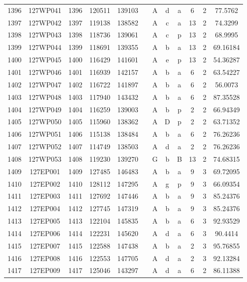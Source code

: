 \begin{tabular}{|*{12}{c|}}
1396 & 127WP041 & 1396 & 120511 & 139103 &  & A & d & a & 6 & 2 & 77.5762 \\ 
1397 & 127WP042 & 1397 & 119138 & 138582 &  & A & c & a & 13 & 2 & 74.3299 \\ 
1398 & 127WP043 & 1398 & 118736 & 139061 &  & A & c & p & 13 & 2 & 68.9995 \\ 
1399 & 127WP044 & 1399 & 118691 & 139355 &  & A & b & a & 13 & 2 & 69.16184 \\ 
1400 & 127WP045 & 1400 & 116429 & 141601 &  & A & e & p & 13 & 2 & 54.36287 \\ 
1401 & 127WP046 & 1401 & 116939 & 142157 &  & A & b & a & 6 & 2 & 63.54227 \\ 
1402 & 127WP047 & 1402 & 116722 & 141897 &  & A & b & a & 6 & 2 & 56.0073 \\ 
1403 & 127WP048 & 1403 & 117940 & 143432 &  & A & b & a & 6 & 2 & 87.35528 \\ 
1404 & 127WP049 & 1404 & 116259 & 139003 &  & A & b & p & 2 & 2 & 66.94349 \\ 
1405 & 127WP050 & 1405 & 115960 & 138362 &  & A & D & p & 2 & 2 & 63.71352 \\ 
1406 & 127WP051 & 1406 & 115138 & 138484 &  & A & b & a & 6 & 2 & 76.26236 \\ 
1407 & 127WP052 & 1407 & 114749 & 138503 &  & A & d & a & 2 & 2 & 76.26236 \\ 
1408 & 127WP053 & 1408 & 119230 & 139270 &  & G & b & B & 13 & 2 & 74.68315 \\ 
1409 & 127EP001 & 1409 & 127485 & 146483 &  & A & b & a & 9 & 3 & 69.72095 \\ 
1410 & 127EP002 & 1410 & 128112 & 147295 &  & A & g & p & 9 & 3 & 66.09354 \\ 
1411 & 127EP003 & 1411 & 127692 & 147446 &  & A & b & a & 9 & 3 & 85.24376 \\ 
1412 & 127EP004 & 1412 & 127745 & 147319 &  & A & b & a & 9 & 3 & 85.24376 \\ 
1413 & 127EP005 & 1413 & 122104 & 145835 &  & A & b & a & 6 & 3 & 92.93529 \\ 
1414 & 127EP006 & 1414 & 122231 & 145620 &  & A & d & a & 6 & 3 & 90.4414 \\ 
1415 & 127EP007 & 1415 & 122588 & 147438 &  & A & b & a & 2 & 3 & 95.76855 \\ 
1416 & 127EP008 & 1416 & 122553 & 147705 &  & A & d & a & 2 & 3 & 92.13284 \\ 
1417 & 127EP009 & 1417 & 125046 & 143297 &  & A & d & a & 6 & 2 & 86.11388 \\ 

\end{tabular}
